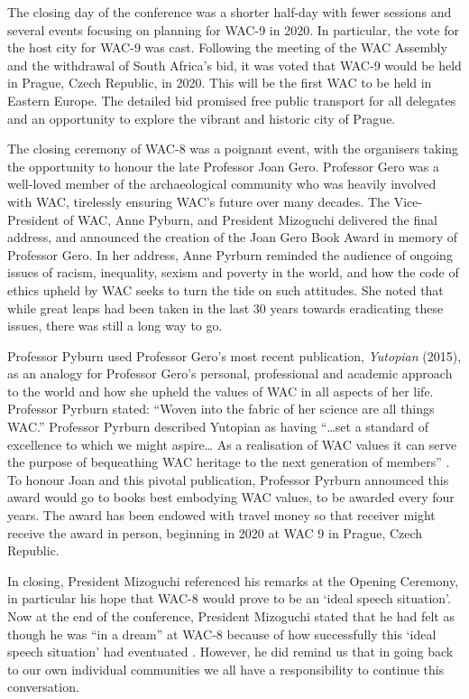 The closing day of the conference was a shorter half-day with fewer sessions and several events focusing on planning for WAC-9 in 2020. In particular, the vote for the host city for WAC-9 was cast.  Following the meeting of the WAC Assembly and the withdrawal of South Africa’s bid, it was voted that WAC-9 would be held in Prague, Czech Republic, in 2020. This will be the first WAC to be held in Eastern Europe. The detailed bid promised free public transport for all delegates and an opportunity to explore the vibrant and historic city of Prague. 

The closing ceremony of WAC-8 was a poignant event, with the organisers taking the opportunity to honour the late Professor Joan Gero. Professor Gero was a well-loved member of the archaeological community who was heavily involved with WAC, tirelessly ensuring WAC’s future over many decades. The Vice-President of WAC, Anne Pyburn, and President Mizoguchi delivered the final address, and announced the creation of the Joan Gero Book Award in memory of Professor Gero. In her address, Anne Pyrburn reminded the audience of ongoing issues of racism, inequality, sexism and poverty in the world, and how the code of ethics upheld by WAC seeks to turn the tide on such attitudes. She noted that while great leaps had been taken in the last 30 years towards eradicating these issues, there was still a long way to go. 

Professor Pyburn used Professor Gero’s most recent publication, \textit{Yutopian} (2015), as an analogy for Professor Gero’s personal, professional and academic approach to the world and how she upheld the values of WAC in all aspects of her life. Professor Pyrburn stated: “Woven into the fabric of her science are all things WAC.” Professor Pyrburn described Yutopian as having “…set a standard of excellence to which we might aspire… As a realisation of WAC values it can serve the purpose of bequeathing WAC heritage to the next generation of members” \parencite{closingWAC}. To honour Joan and this pivotal publication, Professor Pyrburn announced this award would go to books best embodying WAC values, to be awarded every four years. The award has been endowed with travel money so that receiver might receive the award in person, beginning in 2020 at WAC 9 in Prague, Czech Republic. 

In closing, President Mizoguchi referenced his remarks at the Opening Ceremony, in particular his hope that WAC-8 would prove to be an ‘ideal speech situation’. Now at the end of the conference, President Mizoguchi stated that he had felt as though he was “in a dream” at WAC-8 because of how successfully this ‘ideal speech situation’ had eventuated \parencite{closingWAC}. However, he did remind us that in going back to our own individual communities we all have a responsibility to continue this conversation. 

